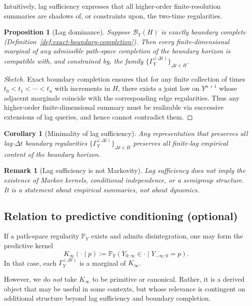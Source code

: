\documentclass[11pt]{article}
\newtheorem{proposition}{Proposition}
\newtheorem{remark}{Remark}
\newtheorem{corollary}{Corollary}
\begin{document}
Intuitively, lag sufficiency expresses that all higher-order finite-resolution
summaries are shadows of, or constraints upon, the two-time regularities.

\begin{proposition}[Lag dominance]\label{prop:lag-dominance}
Suppose $\mathcal B_Y(H)$ is exactly boundary complete (Definition~\ref{def:exact-boundary-completion}).
Then every finite-dimensional marginal of any admissible path-space completion of the
boundary horizon is compatible with, and constrained by, the family
$\{\Gamma_Y^{(\Delta t)}\}_{\Delta t\in H}$.
\end{proposition}

\begin{proof}[Sketch]
Exact boundary completion ensures that for any finite collection of times
$t_0<t_1<\cdots<t_n$ with increments in $H$, there exists a joint law on
$Y^{n+1}$ whose adjacent marginals coincide with the corresponding edge regularities.
Thus any higher-order finite-dimensional summary must be realizable via successive
extensions of lag queries, and hence cannot contradict them.
\end{proof}

\begin{corollary}[Minimality of lag sufficiency]\label{cor:lag-minimality}
Any representation that preserves all lag-$\Delta t$ boundary regularities
$\{\Gamma_Y^{(\Delta t)}\}_{\Delta t\in H}$ preserves all finite-lag empirical content
of the boundary horizon.
\end{corollary}

\begin{remark}[Lag sufficiency is not Markovity]\label{rem:lag-not-markov}
Lag sufficiency does \emph{not} imply the existence of Markov kernels, conditional
independence, or a semigroup structure. It is a statement about empirical summaries,
not about dynamics.
\end{remark}

\subsection{Relation to predictive conditioning (optional)}

If a path-space regularity $\mathbb P_Y$ exists and admits disintegration, one may
form the predictive kernel
\[
K_\infty(\cdot\mid p)
:= \mathbb P_Y(Y_{0:\infty}\in\cdot \mid Y_{-\infty:0}=p).
\]
In that case, each $\Gamma_Y^{(\Delta t)}$ is a marginal of $K_\infty$.

However, we do \emph{not} take $K_\infty$ to be primitive or canonical. Rather, it is
a derived object that may be useful in some contexts, but whose relevance is contingent
on additional structure beyond lag sufficiency and boundary completion.
\end{document}
